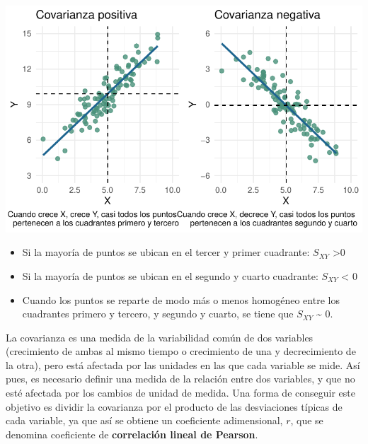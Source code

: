 \documentclass[
  letterpaper,
  DIV=11,
  numbers=noendperiod]{scrartcl}
\begin{document}
\begin{center}
\includegraphics{index_files/figure-pdf/unnamed-chunk-2-1.pdf}
\end{center}

\begin{tcolorbox}[enhanced jigsaw, toptitle=1mm, colbacktitle=quarto-callout-important-color!10!white, opacitybacktitle=0.6, leftrule=.75mm, rightrule=.15mm, title=\textcolor{quarto-callout-important-color}{\faExclamation}\hspace{0.5em}{Importante}, colframe=quarto-callout-important-color-frame, breakable, coltitle=black, bottomrule=.15mm, opacityback=0, left=2mm, titlerule=0mm, bottomtitle=1mm, toprule=.15mm, colback=white, arc=.35mm]

\begin{itemize}
\item
  Si la mayoría de puntos se ubican en el tercer y primer cuadrante:
  \(S_{XY}\) \textgreater0
\item
  Si la mayoría de puntos se ubican en el segundo y cuarto cuadrante:
  \(S_{XY}\) \textless{} 0
\item
  Cuando los puntos se reparte de modo más o menos homogéneo entre los
  cuadrantes primero y tercero, y segundo y cuarto, se tiene que
  \(S_{XY}\) \textasciitilde{} 0.
\end{itemize}

\end{tcolorbox}

La covarianza es una medida de la variabilidad común de dos variables
(crecimiento de ambas al mismo tiempo o crecimiento de una y
decrecimiento de la otra), pero está afectada por las unidades en las
que cada variable se mide. Así pues, es necesario definir una medida de
la relación entre dos variables, y que no esté afectada por los cambios
de unidad de medida. Una forma de conseguir este objetivo es dividir la
covarianza por el producto de las desviaciones típicas de cada variable,
ya que así se obtiene un coeficiente adimensional, \(r\), que se
denomina coeficiente de \textbf{correlación lineal de Pearson}.
\end{document}
